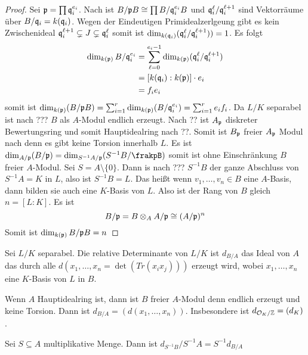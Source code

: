 \begin{proof}
	Sei \(\mathfrak{p}=\prod \mathfrak{q}_i^{e_i}\). Nach  ist 
	\(B/\mathfrak{p} B\cong\prod B/\mathfrak{q}_i^{e_i}B\) und 
	\(\mathfrak{q}_i^\ell/\mathfrak{q}_i^{\ell+1}\) sind Vektorräume über \(B/\mathfrak{q}_i=k(\mathfrak{q}_i)\).
	Wegen der Eindeutigen Primidealzerlgeung gibt es kein Zwischenideal \(\mathfrak{q}_i^{\ell+1}\subsetneq J\subsetneq \mathfrak{q}_i^{\ell}\) somit ist
	\(\dim_{k(\mathfrak{q}_i)}(\mathfrak{q}_i^\ell/\mathfrak{q}_i^{\ell+1}))=1\).
	Es folgt
	\begin{align*}
		\dim_{k(\mathfrak{p})}B/\mathfrak{q}_i^{e_i}&= \sum_{\ell=0}^{e_i-1}\dim_{k(\mathfrak{p})}(\mathfrak{q}_i^{\ell}/\mathfrak{q}_i^{\ell+1})\\
		&=[k(\mathfrak{q}_i):k(\mathfrak{p})]\cdot e_i\\
		&= f_ie_i
		\end{align*}
	somit ist \(\dim_{k(\mathfrak{p})}(B/\mathfrak{p} B)=\sum_{i=1}^r\dim_{k(\mathfrak{p})}(B/\mathfrak{q}_i^{e_i})=\sum_{i=1}^re_if_i\).
	Da \(L/K\) separabel ist nach ??? \(B\) als \(A\)-Modul endlich erzeugt.
	Nach ?? ist \(A_{\mathfrak{p}}\) diskreter Bewertungsring und somit Hauptidealring nach ??. Somit ist \(B_{\mathfrak{p}}\) freier \(A_{\mathfrak{p}}\) Modul nach  denn es gibt keine Torsion innerhalb \(L\).
	Es ist \(\dim_{A/\frakp}(B/\frakp)=\dim_{S^{-1} A/\frakp}(S^{-1}B/\frakpB)\) somit ist ohne Einschränkung \(B\) freier \(A\)-Modul. Sei \(S=A\setminus\{0\}\).
	Dann is nach ??? \(S^{-1}B\) der ganze Abschluss von \(S^{-1}A=K\) in \(L\), also ist \(S^{-1}B=L\).
	Das heißt wenn \(v_1,\dots,v_n\in B\) eine \(A\)-Basis, dann bilden sie auch eine \(K\)-Basis von \(L\).
	Also ist der Rang von \(B\) gleich \(n=[L:K]\).
	Es ist \[B/\mathfrak{p}=B\otimes_AA/\mathfrak{p}\cong (A/\mathfrak{p})^n\]
	Somit ist \(\dim_{k(\mathfrak{p})}B/\mathfrak{p} B=n\)
	
\end{proof}
\begin{Def}
	 Sei \(L/K\) separabel. Die relative Determinante von \(L/K\) ist 
	 \(d_{B/A}\) das Ideal von \(A\) das durch alle \(d(x_1,\dots,x_n=\det(Tr(x_ix_j)))\) erzeugt wird, wobei \(x_1,\dots,x_n\) eine \(K\)-Basis von \(L\) in \(B\).
\end{Def}
\begin{Def}
	Wenn \(A\) Hauptidealring ist, dann ist \(B\) freier \(A\)-Modul denn endlich erzeugt und keine Torsion.
	Dann ist \(d_{B/A}=(d(x_1,\dots,x_n))\).
	Insbesondere ist \(d_{\mathcal{O}_K/\mathbb{Z}}=(d_K)\).
\end{Def}
\begin{Bem}
	Sei \(S\subseteq A\) multiplikative Menge. Dann ist
	\(d_{S^{-1}B}/S^{-1}A=S^{-1}d_{B/A}\)
\end{Bem}
